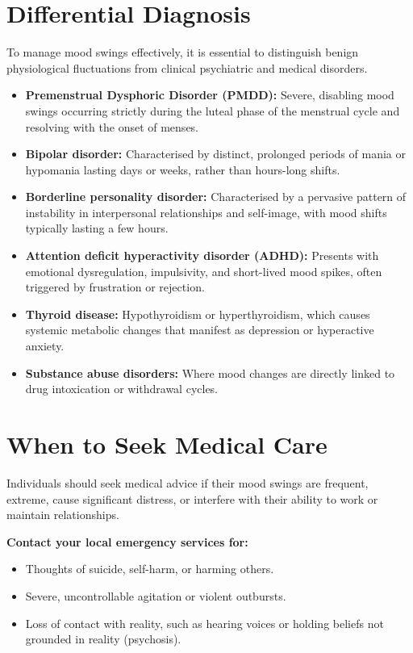 \section*{Differential Diagnosis}
To manage mood swings effectively, it is essential to distinguish benign physiological fluctuations from clinical psychiatric and medical disorders.
\begin{itemize}
    \item \textbf{Premenstrual Dysphoric Disorder (PMDD):} Severe, disabling mood swings occurring strictly during the luteal phase of the menstrual cycle and resolving with the onset of menses.
    \item \textbf{Bipolar disorder:} Characterised by distinct, prolonged periods of mania or hypomania lasting days or weeks, rather than hours-long shifts.
    \item \textbf{Borderline personality disorder:} Characterised by a pervasive pattern of instability in interpersonal relationships and self-image, with mood shifts typically lasting a few hours.
    \item \textbf{Attention deficit hyperactivity disorder (ADHD):} Presents with emotional dysregulation, impulsivity, and short-lived mood spikes, often triggered by frustration or rejection.
    \item \textbf{Thyroid disease:} Hypothyroidism or hyperthyroidism, which causes systemic metabolic changes that manifest as depression or hyperactive anxiety.
    \item \textbf{Substance abuse disorders:} Where mood changes are directly linked to drug intoxication or withdrawal cycles.
\end{itemize}

\section*{When to Seek Medical Care}
Individuals should seek medical advice if their mood swings are frequent, extreme, cause significant distress, or interfere with their ability to work or maintain relationships.

\textbf{Contact your local emergency services for:}
\begin{itemize}
    \item Thoughts of suicide, self-harm, or harming others.
    \item Severe, uncontrollable agitation or violent outbursts.
    \item Loss of contact with reality, such as hearing voices or holding beliefs not grounded in reality (psychosis).
\end{itemize}

